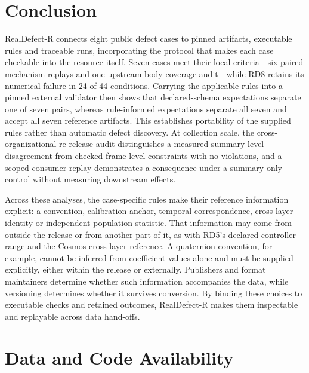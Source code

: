 \documentclass[conference]{IEEEtran}
\begin{document}
\section{Conclusion}

\mbox{RealDefect-R} connects eight public defect cases to pinned artifacts, executable rules and traceable runs, incorporating the protocol that makes each case checkable into the resource itself. Seven cases meet their local criteria---six paired mechanism replays and one upstream-body coverage audit---while RD8 retains its numerical failure in 24 of 44 conditions. Carrying the applicable rules into a pinned external validator then shows that declared-schema expectations separate one of seven pairs, whereas rule-informed expectations separate all seven and accept all seven reference artifacts. This establishes portability of the supplied rules rather than automatic defect discovery. At collection scale, the cross-organizational re-release audit distinguishes a measured summary-level disagreement from checked frame-level constraints with no violations, and a scoped consumer replay demonstrates a consequence under a summary-only control without measuring downstream effects.\par

Across these analyses, the case-specific rules make their reference information explicit: a convention, calibration anchor, temporal correspondence, cross-layer identity or independent population statistic. That information may come from outside the release or from another part of it, as with RD5's declared controller range and the Cosmos cross-layer reference. A quaternion convention, for example, cannot be inferred from coefficient values alone and must be supplied explicitly, either within the release or externally. Publishers and format maintainers determine whether such information accompanies the data, while versioning determines whether it survives conversion. By binding these choices to executable checks and retained outcomes, \mbox{RealDefect-R} makes them inspectable and replayable across data hand-offs.\par

\section*{Data and Code Availability}
\end{document}

